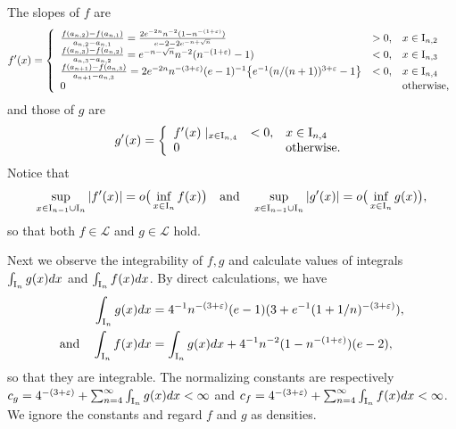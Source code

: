 \documentclass[12pt,leqno]{amsart}
\newcommand{\rI}{{\rm I}}
\newcommand{\vep}{\varepsilon}
\newcommand{\call}{{\mathcal L}}
\newcommand{\1}{{\mathbf 1}}
\begin{document}
The slopes of $f$ are 
\begin{align}
\label{derivative:f:ex2}
\begin{split}
f'(x)= \left\{
\begin{array}{lll}
\frac{f(a_{n,2})-f(a_{n,1})}{a_{n,2}-a_{n,1}}= 
\frac{2e^{-2n} n^{-2}(1-n^{-(1+\vep)})}{e-2-2e^{-n+\sqrt{n}}} & >0, & x\in \rI_{n,2}  \\
\frac{f(a_{n,3})-f(a_{n,2})}{a_{n,3}-a_{n,2}}= e^{-n-\sqrt{n}} n^{-2}(n^{-(1+\vep)}-1) & <0, & x\in \rI_{n,3} \\
\frac{f(a_{n+1})-f(a_{n,3})}{a_{n+1}-a_{n,3}}
= 2 e^{-2 n} n^{-(3+\vep)}(e-1)^{-1}\big\{e^{-1}(n/(n+1))^{3+\vep} -1\big\} &<0, & x\in \rI_{n,4} \\
0 & & \text{otherwise},  
\end{array}
\right.
\end{split}
\end{align}
and those of $g$ are 
\begin{align*}
g'(x)= \left\{
\begin{array}{lll}
f'(x)\mid_{x\in \rI_{n,4}} &<0, & x\in \rI_{n,4} \\
0 & & \text{otherwise}. 
\end{array}
\right.
\end{align*}
Notice that
\[
 \sup_{x\in \rI_{n-1}\cup \rI_n} |f'(x)|=o\big(
\inf_{x\in\rI_{n}} f(x)\big)
\quad \text{and}\quad  \sup_{x\in \rI_{n-1}\cup \rI_n} |g'(x)|=o\big(
\inf_{x\in\rI_{n}}g(x)
\big), 
\]
so that both $f\in\call$ and $g\in \call$ hold. 

Next we observe the integrability of $f,g$ and calculate 
values of integrals $\int_{\rI_n}g(x)dx$ and $\int_{\rI_n}f(x)dx$. %
By direct calculations, we have  
\begin{align}
\begin{split}
\label{area:intg:intr}
\int_{\rI_n}g(x)dx &=  4^{-1}n^{-(3+\vep)} (e-1)(3+e^{-1}(1+1/n)^{-(3+\vep)}),\\
\text{and}\quad \int_{\rI_n}f(x)dx &= \int_{\rI_n}g(x)dx + 
4^{-1}n^{-2}(1-n^{-(1+\vep)})(e-2), 
\end{split}
\end{align}
so that they are integrable. The normalizing constants are respectively 
$c_g=4^{-(3+\vep)}+ \sum_{n=4}^\infty \int_{\rI_n}g(x)dx<\infty$
and $c_f=4^{-(3+\vep)}+\sum_{n=4}^\infty \int_{\rI_n}f(x)dx<\infty$. 
We ignore the constants and regard $f$ and $g$ as densities.
\end{document}
